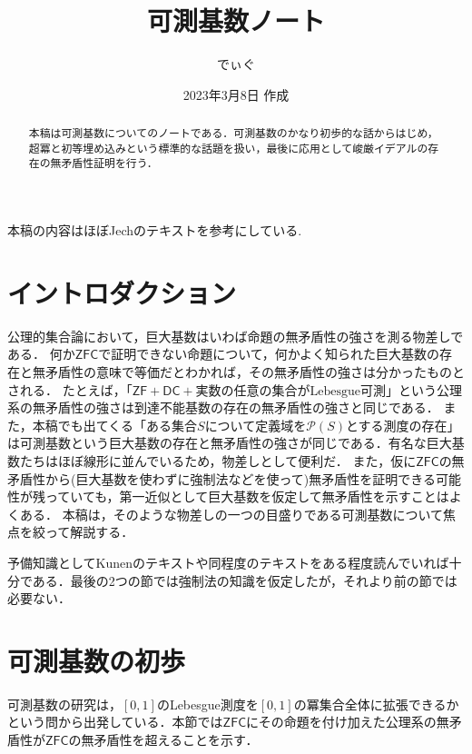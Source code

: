 \documentclass[uplatex]{jsarticle}
\title{可測基数ノート}
\date{2023年3月8日 作成}
\author{でぃぐ}
\newcommand{\Pow}{\mathcal{P}}
\newcommand{\ZFC}{\mathsf{ZFC}}
\theoremstyle{definition}
\begin{document}
	
	\maketitle
	
	\begin{abstract}
		本稿は可測基数についてのノートである．可測基数のかなり初歩的な話からはじめ，超冪と初等埋め込みという標準的な話題を扱い，最後に応用として峻厳イデアルの存在の無矛盾性証明を行う．
	\end{abstract}
	
	\tableofcontents
	
	\vspace{1cm}
	
	本稿の内容はほぼJechのテキスト\cite{jech2006set}を参考にしている.
	
	\section{イントロダクション}
	
	公理的集合論において，巨大基数はいわば命題の無矛盾性の強さを測る物差しである．
	何か$\ZFC$で証明できない命題について，何かよく知られた巨大基数の存在と無矛盾性の意味で等価だとわかれば，その無矛盾性の強さは分かったものとされる．
	たとえば，「$\mathsf{ZF}+\mathsf{DC}+\text{実数の任意の集合がLebesgue可測}$」という公理系の無矛盾性の強さは到達不能基数の存在の無矛盾性の強さと同じである．
	また，本稿でも出てくる「ある集合$S$について定義域を$\Pow(S)$とする測度の存在」は可測基数という巨大基数の存在と無矛盾性の強さが同じである．有名な巨大基数たちはほぼ線形に並んでいるため，物差しとして便利だ．
	また，仮に$\ZFC$の無矛盾性から(巨大基数を使わずに強制法などを使って)無矛盾性を証明できる可能性が残っていても，第一近似として巨大基数を仮定して無矛盾性を示すことはよくある．
	本稿は，そのような物差しの一つの目盛りである可測基数について焦点を絞って解説する．
	
	予備知識としてKunenのテキストや同程度のテキストをある程度読んでいれば十分である．最後の2つの節では強制法の知識を仮定したが，それより前の節では必要ない．
	
	
	\section{可測基数の初歩}
	
	可測基数の研究は，$[0, 1]$のLebesgue測度を$[0, 1]$の冪集合全体に拡張できるかという問から出発している．本節では$\ZFC$にその命題を付け加えた公理系の無矛盾性が$\ZFC$の無矛盾性を超えることを示す．
	
\end{document}
